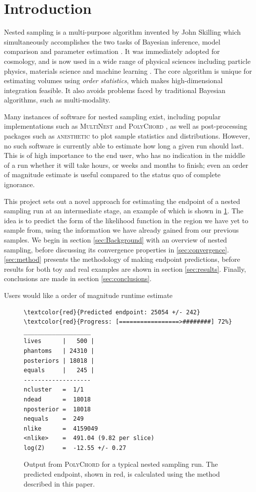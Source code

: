 \documentclass[usenatbib]{mnras}
\begin{document}
\section{Introduction}
Nested sampling is a multi-purpose algorithm invented by John Skilling which simultaneously accomplishes the two tasks of Bayesian inference, model comparison and parameter estimation \citep{skilling}. It was immediately adopted for cosmology, and is now used in a wide range of physical sciences including particle physics, materials science \citep{physical_scientists} and machine learning \citep{sparse_reconstruction}. The core algorithm is unique for estimating volumes using \textit{order statistics}, which makes high-dimensional integration feasible. It also avoids problems faced by traditional Bayesian algorithms, such as multi-modality.
\par
Many instances of software for nested sampling exist, including popular implementations such as \textsc{MultiNest} \citep{multinest} and \textsc{PolyChord} \citep{polychord}, as well as post-processing packages such as \textsc{anesthetic} \citep{anesthetic} to plot sample statistics and distributions. However, no such software is currently able to estimate how long a given run should last. This is of high importance to the end user, who has no indication in the middle of a run whether it will take hours, or weeks and months to finish; even an order of magnitude estimate is useful compared to the status quo of complete ignorance.
\par
This project sets out a novel approach for estimating the endpoint of a nested sampling run at an intermediate stage, an example of which is shown in \cref{fig:polychord_output}. The idea is to predict the form of the likelihood function in the region we have yet to sample from, using the information we have already gained from our previous samples. We begin in section \cref{sec:Background} with an overview of nested sampling, before discussing its convergence properties in \cref{sec:convergence}. \cref{sec:method} presents the methodology of making endpoint predictions, before results for both toy and real examples are shown in section \cref{sec:results}. Finally, conclusions are made in section \cref{sec:conclusions}.
\par
Users would like a order of magnitude runtime estimate
\begin{figure}
\begin{Verbatim}[frame=single, commandchars=\\\{\}]
\textcolor{red}{Predicted endpoint: 25054 +/- 242}
\textcolor{red}{Progress: [=================>########] 72%}
___________________
lives      |   500 |
phantoms   | 24310 |
posteriors | 18018 |
equals     |   245 |
-------------------
ncluster   =  1/1
ndead      =  18018
nposterior =  18018
nequals    =  249
nlike      =  4159049
<nlike>    =  491.04 (9.82 per slice)
log(Z)     =  -12.55 +/- 0.27
\end{Verbatim}
\caption{Output from \textsc{PolyChord} for a typical nested sampling run. The predicted endpoint, shown in red, is calculated using the method described in this paper.}
\label{fig:polychord_output}
\end{figure}
\end{document}
